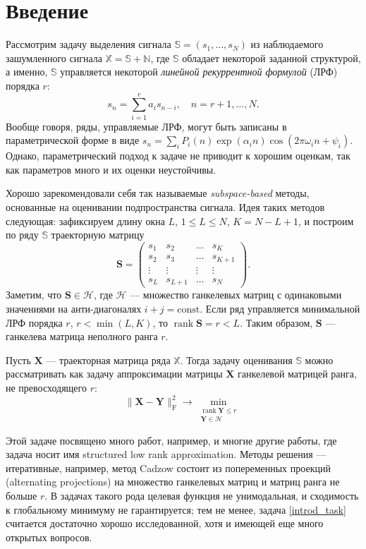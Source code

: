 \documentclass[12pt,a4paper,fleqn,leqno]{article}
\def\rank{\mathop{\mathrm{rank}}}
\newcommand{\rmF}{\mathrm{F}}
\newcommand{\tsN}{\mathbb{N}}
\newcommand{\tsS}{\mathbb{S}}
\newcommand{\tsX}{\mathbb{X}}
\newcommand{\bfS}{\mathbf{S}}
\newcommand{\bfX}{\mathbf{X}}
\newcommand{\bfY}{\mathbf{Y}}
\newcommand{\calH}{\mathcal{H}}
\begin{document}
\section{Введение}
Рассмотрим задачу выделения сигнала $\tsS = (s_1, \ldots, s_N)$ из наблюдаемого зашумленного сигнала $\tsX = \tsS + \tsN$, где $\tsS$  обладает некоторой заданной структурой, а именно, $\tsS$ управляется некоторой \emph{линейной рекуррентной формулой} (ЛРФ) порядка $r$:
\begin{equation*}
s_n = \sum_{i = 1}^{r} a_i s_{n-i}, \quad n = r + 1, \ldots, N.
\end{equation*}
Вообще говоря, ряды, управляемые ЛРФ, могут быть записаны в параметрической форме в виде $s_n = \sum_i P_i(n) \exp(\alpha_i n) \cos(2 \pi \omega_i n + \psi_i)$. Однако, параметрический подход к задаче не приводит к хорошим оценкам, так как параметров много и их оценки неустойчивы.

Хорошо зарекомендовали себя так называемые \emph{subspace-based} методы, основанные на оценивании подпространства сигнала. 
Идея таких методов следующая: зафиксируем длину окна $L$, $1 \le L \le N$, $K = N - L + 1$, и построим по ряду $\tsS$ траекторную матрицу
\begin{equation*}
\bfS = \begin{pmatrix}
s_1 & s_2 & \ldots & s_K \\
s_2 & s_3 & \ldots & s_{K + 1} \\
\vdots & \vdots & \vdots & \vdots \\
s_L & s_{L + 1} & \ldots & s_N
\end{pmatrix}.
\end{equation*}
Заметим, что $\bfS\in \calH$, где $\calH$ --- множество ганкелевых матриц с одинаковыми значениями на анти-диагоналях $i+j=\mathrm{const}$.
Если ряд управляется минимальной ЛРФ порядка $r$, $r < \min(L, K)$, то $\rank \bfS = r < L$. Таким образом, $\bfS$ --- ганкелева матрица неполного ранга $r$.

Пусть $\bfX$ --- траекторная матрица ряда $\tsX$. Тогда задачу оценивания $\tsS$ можно рассматривать как задачу аппроксимации матрицы $\bfX$ ганкелевой матрицей ранга, не превосходящего $r$:
\begin{equation}\label{introd_task}
\|\bfX - \bfY\|^2_\rmF \to \min_{\substack{\rank \bfY \le r \\ \bfY \in \calH}}
\end{equation}

Этой задаче посвящено много работ, например, \cite{Cadzow1988, Markovsky2011, Usevich.Markovsky2014, Gillard.Zhigljavsky2013} и многие другие работы, где задача носит имя
structured low rank approximation. Методы решения --- итеративные, например, метод Cadzow состоит из попеременных проекций (alternating projections) на множество ганкелевых матриц и матриц ранга не больше $r$. В задачах такого рода целевая функция не унимодальная, и сходимость к глобальному минимуму не гарантируется; тем не менее, задача \eqref{introd_task} считается достаточно хорошо исследованной, хотя и имеющей еще много открытых вопросов.
\end{document}
